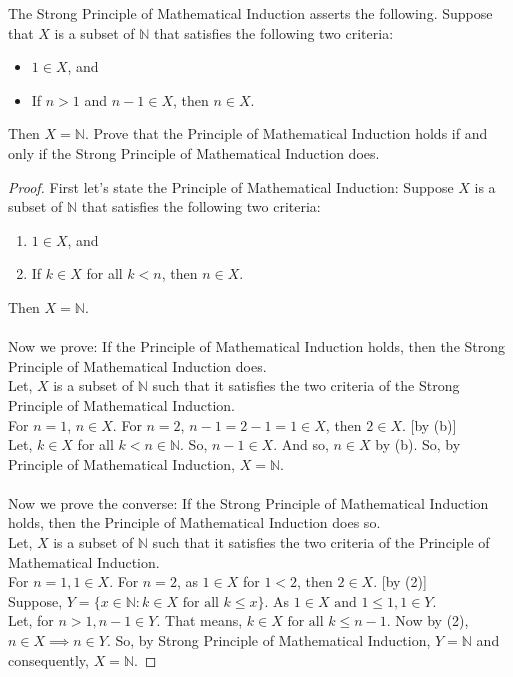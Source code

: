 \documentclass[12pt]{article}
\newenvironment{problem}[2][Problem]{\begin{trivlist}
\item[\hskip \labelsep {\bfseries #1}\hskip \labelsep {\bfseries #2.}]}{\end{trivlist}}
\begin{document}
\begin{problem}{17}
The Strong Principle of Mathematical Induction asserts the following. Suppose that
\( X \) is a subset of \( \mathbb{N} \) that satisfies the following two criteria:
\begin{itemize}
	\item[(a)] \( 1 \in X \), and
	\item[(b)] If \( n > 1 \) and \( n - 1 \in X \), then \( n \in X \).
\end{itemize}
Then \( X = \mathbb{N} \). Prove that the Principle of Mathematical Induction holds if and only if
the Strong Principle of Mathematical Induction does.

\end{problem}

\begin{proof}
	First let's state the Principle of Mathematical Induction: Suppose \( X \) is a subset of \( \mathbb{N} \) that satisfies the following two criteria:
	\begin{enumerate}
		\item \( 1 \in X \), and
		\item If \( k \in X \) for all \( k < n \), then \( n \in X \).
	\end{enumerate}
	Then \( X = \mathbb{N} \).\\\\
	Now we prove: If the Principle of Mathematical Induction holds, then the Strong Principle of Mathematical Induction does.\\
	Let, $X$ is a subset of $\mathbb{N}$ such that it satisfies the two criteria of the Strong Principle of Mathematical Induction. \\
	For $n = 1$, $n \in X$. For $n = 2$, $n-1 = 2-1 = 1 \in X$, then $2 \in X$. {[by (b)]}\\
	Let, $k \in X$ for all $k < n \in \mathbb{N}$. So, $n-1 \in X$. And so, $n \in X$ by (b). So, by Principle of Mathematical Induction, $X = \mathbb{N}$.\\\\
	Now we prove the converse: If the Strong Principle of Mathematical Induction holds, then the Principle of Mathematical Induction does so. \\
	Let, $X$ is a subset of $\mathbb{N}$ such that it satisfies the two criteria of the Principle of Mathematical Induction. \\
	For $n = 1, 1 \in X$. For $n = 2$, as $1 \in X$ for $1 < 2$, then $2 \in X$. {[by (2)]} \\
	Suppose, $Y = \{ x\in \mathbb{N} : k\in X \text{ for all } k \leq x \}$. As $1\in X \text{ and } 1 \leq 1, 1\in Y$.\\
	Let, for $n>1, n-1 \in Y$. That means, $k \in X \text{ for all } k \leq n-1$. Now by (2), $n\in X \implies n\in Y$. So, by Strong Principle of Mathematical Induction, $Y = \mathbb{N}$ and consequently, $X = \mathbb{N}$.

\end{proof}














\end{document}
